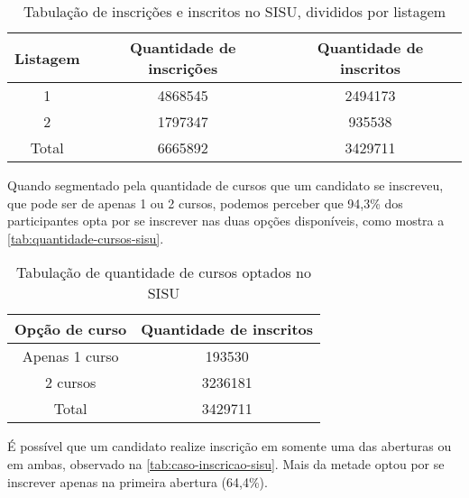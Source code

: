 \begin{table}[h]
  \begin{tabular}{ccc}
  \hline
  \multicolumn{1}{c}{\textbf{Listagem}} & \textbf{Quantidade de inscrições} & \textbf{Quantidade de inscritos} \\ \hline
  1                                     & 4868545                           & 2494173                          \\ \hline
  2                                     & 1797347                           & 935538                           \\ \hline
  Total                                 & 6665892                           & 3429711                          \\ \hline
  \end{tabular}
  \caption{Tabulação de inscrições e inscritos no SISU, divididos por listagem}
  \label{tab:inscricoes-inscritos-sisu}
  \end{table}

Quando segmentado pela quantidade de cursos que um candidato se inscreveu, que pode ser de apenas 1 ou 2 cursos, podemos perceber que 94,3\% dos participantes opta por se inscrever nas duas opções disponíveis, como mostra a \autoref{tab:quantidade-cursos-sisu}.

  \begin{table}[h]
    \begin{tabular}{cc}
    \hline
    \textbf{Opção de curso} & \textbf{Quantidade de inscritos} \\ \hline
    Apenas 1 curso          & 193530                           \\ \hline
    2 cursos                & 3236181                          \\ \hline
    Total                   & 3429711                          \\ \hline
    \end{tabular}
    \caption{Tabulação de quantidade de cursos optados no SISU}
    \label{tab:quantidade-cursos-sisu}
    \end{table}

\pagebreak

É possível que um candidato realize inscrição em somente uma das aberturas ou em ambas, observado na \autoref{tab:caso-inscricao-sisu}. Mais da metade optou por se inscrever apenas na primeira abertura (64,4\%).

